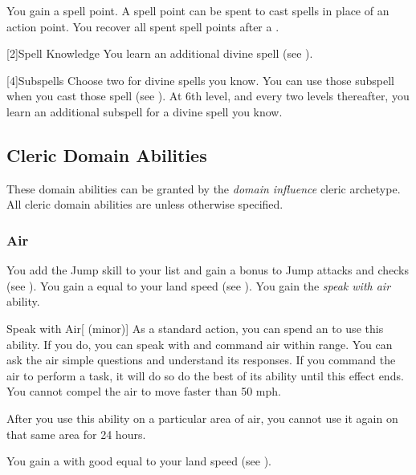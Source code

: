         You gain a spell point.
        A spell point can be spent to cast spells in place of an action point.
        You recover all spent spell points after a .

        [2]{Spell Knowledge}
        You learn an additional divine spell (see ).

        [4]{Subspells}
        Choose two  for divine spells you know.
        You can use those subspell when you cast those spell (see ).
        At 6th level, and every two levels thereafter, you learn an additional subspell for a divine spell you know.

    \subsection{Cleric Domain Abilities}\label{Cleric Domain Abilities}
        These domain abilities can be granted by the \textit{domain influence} cleric archetype.
        All cleric domain abilities are  unless otherwise specified.

        \subsubsection{Air}
             You add the Jump skill to your  list and gain a  bonus to Jump attacks and checks (see ).
             You gain a  equal to your land speed (see ).
             You gain the \textit{speak with air} ability.
            \begin{ability}{Speak with Air}[ (minor)]
                As a standard action, you can spend an  to use this ability.
                If you do, you can speak with and command air within \rnglong range.
                You can ask the air simple questions and understand its responses.
                If you command the air to perform a task, it will do so do the best of its ability until this effect ends.
                You cannot compel the air to move faster than 50 mph.

                After you use this ability on a particular area of air, you cannot use it again on that same area for 24 hours.
            \end{ability}
             You gain a  with good  equal to your land speed (see ).

